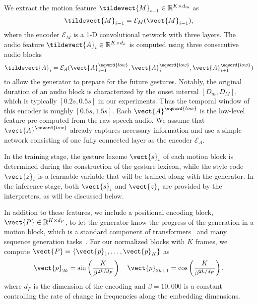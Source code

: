 We extract the motion feature $\tildevect{M}_{i-1}\in\mathbb{R}^{K\times{}d_{\tilde{m}}}$ as 
\begin{equation}
    \tildevect{M}_{i-1} = \mathcal{E}_M(\vect{M}_{i-1}),
\end{equation}
where the encoder $\mathcal{E}_M$ is a 1-D convolutional network with three layers.
%
The audio feature $\tildevect{A}_{i}\in\mathbb{R}^{K\times{}d_{\tilde{a}}}$ is computed using three consecutive audio blocks
\begin{equation}
    \tildevect{A}_{i} = \mathcal{E}_A(\vect{A}^{\eqword{low}}_{i-1},\vect{A}^{\eqword{low}}_{i},\vect{A}^{\eqword{low}}_{i+1})
\end{equation}
to allow the generator to prepare for the future gestures. 
Notably, the original duration of an audio block is characterized by the onset interval $[D_m, D_M]$, which is typically $[0.2s, 0.5s]$ in our experiments. Thus the temporal window of this encoder is roughly $[0.6s, 1.5s]$.
Each $\vect{A}^{\eqword{low}}$ is the low-level feature pre-computed from the raw speech audio. We assume that $\vect{A}^{\eqword{low}}$ already captures necessary information and use a simple network consisting of one fully connected layer as the encoder $\mathcal{E}_A$.

In the training stage, the gesture lexeme $\vect{s}_i$ of each motion block is determined during the construction of the gesture lexicon, while the style code $\vect{z}_i$ is a learnable variable that will be trained along with the generator. In the inference stage, both $\vect{s}_i$ and $\vect{z}_i$ are provided by the interpreters, as will be discussed below.

In addition to these features, we include a positional encoding block, $\vect{P}\in\mathbb{R}^{K\times{}d_{P}}$, to let the generator know the progress of the generation in a motion block, which is a standard component of transformers~\cite{Vaswani2017_Attentiona} and many sequence generation tasks~\cite{Harvey2020_motionInBetween}. For our normalized blocks with $K$ frames, we compute $\vect{P}=\{\vect{p}_1,\dots,\vect{p}_K\}$ as
\begin{align}
    \vect{p}_{2k} = \sin\left(\frac{K}{\beta^{2k/d_{P}}}\right) \quad
    \vect{p}_{2k+1} = \cos\left(\frac{K}{\beta^{2k/d_{P}}}\right),
    \label{eqn:pos_enc}
\end{align}
where $d_{P}$ is the dimension of the encoding and $\beta=10,000$ is a constant controlling the rate of change in frequencies along the embedding dimensions.

